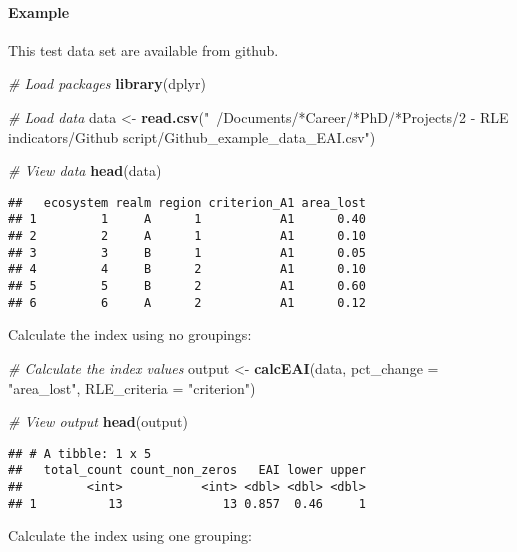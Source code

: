 \documentclass[]{article}
\newenvironment{Shaded}{\begin{snugshade}}{\end{snugshade}}
\newcommand{\KeywordTok}[1]{\textcolor[rgb]{0.13,0.29,0.53}{\textbf{#1}}}
\newcommand{\DataTypeTok}[1]{\textcolor[rgb]{0.13,0.29,0.53}{#1}}
\newcommand{\StringTok}[1]{\textcolor[rgb]{0.31,0.60,0.02}{#1}}
\newcommand{\CommentTok}[1]{\textcolor[rgb]{0.56,0.35,0.01}{\textit{#1}}}
\newcommand{\NormalTok}[1]{#1}
\let\oldparagraph\paragraph
\renewcommand{\paragraph}[1]{\oldparagraph{#1}\mbox{}}
\begin{document}
\paragraph{Example}\label{example}

This test data set are available from github.

\begin{Shaded}
\begin{Highlighting}[]
\CommentTok{# Load packages}
\KeywordTok{library}\NormalTok{(dplyr)}

\CommentTok{# Load data}
\NormalTok{data <-}\StringTok{ }\KeywordTok{read.csv}\NormalTok{(}\StringTok{"~/Documents/*Career/*PhD/*Projects/2 - RLE indicators/Github script/Github_example_data_EAI.csv"}\NormalTok{)}

\CommentTok{# View data}
\KeywordTok{head}\NormalTok{(data)}
\end{Highlighting}
\end{Shaded}

\begin{verbatim}
##   ecosystem realm region criterion_A1 area_lost
## 1         1     A      1           A1      0.40
## 2         2     A      1           A1      0.10
## 3         3     B      1           A1      0.05
## 4         4     B      2           A1      0.10
## 5         5     B      2           A1      0.60
## 6         6     A      2           A1      0.12
\end{verbatim}

Calculate the index using no groupings:

\begin{Shaded}
\begin{Highlighting}[]
\CommentTok{# Calculate the index values}
\NormalTok{output <-}\StringTok{ }\KeywordTok{calcEAI}\NormalTok{(data,}
                  \DataTypeTok{pct_change =} \StringTok{"area_lost"}\NormalTok{,}
                  \DataTypeTok{RLE_criteria =} \StringTok{"criterion"}\NormalTok{)}

\CommentTok{# View output}
\KeywordTok{head}\NormalTok{(output)}
\end{Highlighting}
\end{Shaded}

\begin{verbatim}
## # A tibble: 1 x 5
##   total_count count_non_zeros   EAI lower upper
##         <int>           <int> <dbl> <dbl> <dbl>
## 1          13              13 0.857  0.46     1
\end{verbatim}

Calculate the index using one grouping:
\end{document}
